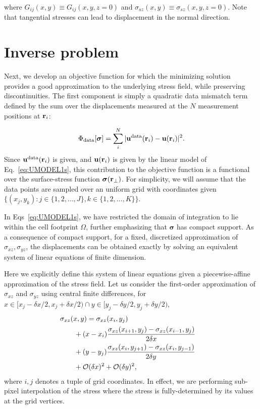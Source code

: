 \documentclass[aps,prl,reprint,twocolumn,groupedaddress,showpacs]{revtex4-1}
\def\r{{\bf r}}
\def\u{{\bf u}}
\newcommand{\bs}{\boldsymbol{\sigma}}
\begin{document}
where $G_{ij}(x,y) \equiv G_{ij}(x,y,z=0)$ and $\sigma_{sz}(x,y)
\equiv \sigma_{sz}(x,y,z=0)$.  Note that tangential stresses can lead
to displacement in the normal direction.


\section{Inverse problem}

Next, we develop an objective function for which the minimizing
solution provides a good approximation to the underlying stress field,
while preserving discontinuities.  The first component is simply a
quadratic data mismatch term defined by the sum over the displacements
measured at the $N$ measurement positions at $\r_{i}$:

\begin{equation}
\Phi_{\rm data}[\bs] = \sum_{i}^{N}\vert \u^{\rm
  data}(\r_{i})- \u(\r_i)\vert^{2}.
\end{equation}
%
Since $\u^{\rm data}(\r_{i})$ is given, and $\u(\r_{i})$ is given by the linear model 
of Eq.~\ref{eq:UMODEL1s}, this contribution to the objective function is
a functional over the surface-stress function $\bs(\r_{\perp})$.  For
simplicity, we will assume that the data points are sampled over an
uniform grid with coordinates given $\{ (x_j,y_k) :
j\in\{1,2,\ldots,J\}, k\in\{1,2,\ldots,K\}\}.$

In Eqs~\ref{eq:UMODEL1s}, we have restricted the domain of integration
to lie within the cell footprint $\Omega$, further emphasizing that
$\boldsymbol\sigma$ has compact support. As a consequence of compact
support, for a fixed, discretized approximation of
$\sigma_{xz},\sigma_{yz}$, the displacements can be obtained exactly
by solving an equivalent system of linear equations of finite
dimension.

Here we explicitly define this system of linear equations given a
piecewise-affine approximation of the stress field. Let us consider
the first-order approximation of $\sigma_{xz}$ and $\sigma_{yz}$ using
central finite differences, for $x\in[x_j - \delta x/2, x_j+\delta
  x/2) \cap y\in[y_j-\delta y/2, y_j + \delta y /2)$,
\begin{align}
\lefteqn{\sigma_{xz}(x,y) =\sigma_{xz}(x_i , y_j)  }\nonumber \\
& \qquad+ (x-x_i)\frac{\sigma_{xz}(x_{i+1},y_j) -\sigma_{xz}(x_{i-1},y_j) }{2\delta x}  \nonumber\\
&\qquad + (y-y_j)\frac{\sigma_{xz}(x_i,y_{j+1}) - \sigma_{xz}(x_i,y_{j-1}) }{2\delta y} \nonumber\\
&\qquad + \mathcal{O}(\delta x)^2 + \mathcal{O}(\delta y)^2,\label{eq:sigma_affine}
\end{align}
where $i,j$ denotes a tuple of grid coordinates. In effect, we are
performing sub-pixel interpolation of the stress where the stress is
fully-determined by its values at the grid vertices.
\end{document}
